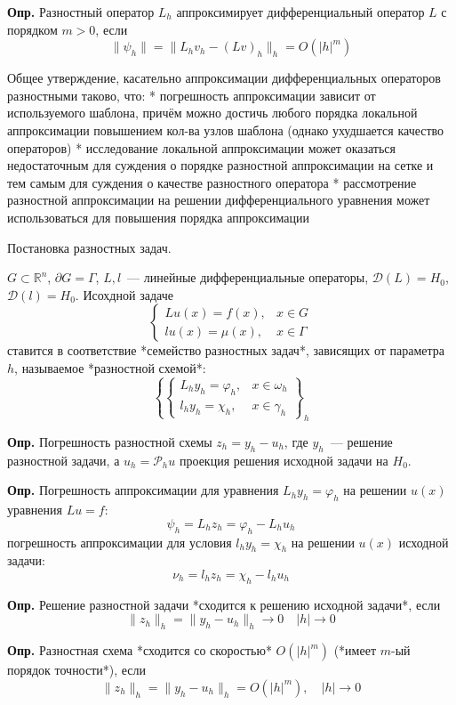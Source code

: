 \textbf{Опр.} Разностный оператор $L_h$ аппроксимирует дифференциальный оператор $L$ с порядком $m>0$, если
$$
    \| \psi_h \| = \| L_h v_h - (Lv)_h \|_h = O(|h|^m)
$$

Общее утверждение, касательно аппроксимации дифференциальных операторов разностными таково, что:
* погрешность аппроксимации зависит от используемого шаблона, причём можно достичь любого порядка локальной аппроксимации повышением кол-ва узлов шаблона (однако ухудшается качество операторов)
* исследование локальной аппроксимации может оказаться недостаточным для суждения о порядке разностной аппроксимации на сетке и тем самым для суждения о качестве разностного оператора
* рассмотрение разностной аппроксимации на решении дифференциального уравнения может использоваться для повышения порядка аппроксимации


Постановка разностных задач.

$G\subset \mathbb{R}^n$, $\partial G = \Gamma$, $L, l$~--- линейные дифференциальные операторы, $\mathcal{D}(L) = H_0$, $\mathcal{D}(l) = H_0$. 
Исохдной задаче
$$
    \begin{cases}
        Lu(x) = f(x), & x \in G\\
        lu(x) = \mu (x), & x \in \Gamma
    \end{cases}
$$
ставится в соответствие *семейство разностных задач*, зависящих от параметра $h$, называемое *разностной схемой*:
$$
    \left\{ 
        \begin{cases}
            L_h y_h = \varphi_h, & x \in \omega_h\\
            l_h y_h = \chi_h, & x \in \gamma_h
        \end{cases}
        \right\}_h
$$

\textbf{Опр.} Погрешность разностной схемы $z_h = y_h - u_h$, где $y_h$~--- решение разностной задачи, а $u_h = \mathcal{P}_h u$ проекция решения исходной задачи на $H_0$.

\textbf{Опр.} Погрешность аппроксимации для уравнения $L_h y_h = \varphi_h$ на решении $u(x)$ уравнения $Lu = f$:
$$
    \psi_h = L_h z_h = \varphi_h - L_h u_h
$$
погрешность аппроксимации для условия $l_h y_h = \chi_h$ на решении $u(x)$ исходной задачи:
$$
    \nu_h = l_h z_h = \chi_h - l_h u_h
$$

\textbf{Опр.} Решение разностной задачи *сходится к решению исходной задачи*, если 
$$
    \| z_h\|_h = \|y_h - u_h \|_h \rightarrow 0 \quad  |h| \rightarrow 0
$$

\textbf{Опр.} Разностная схема *сходится со скоростью* $O(|h|^m)$ (*имеет $m$-ый порядок точности*), если 
$$
    \| z_h \|_h = \| y_h - u_h \|_h = O(|h|^m), \quad |h| \rightarrow 0
$$

